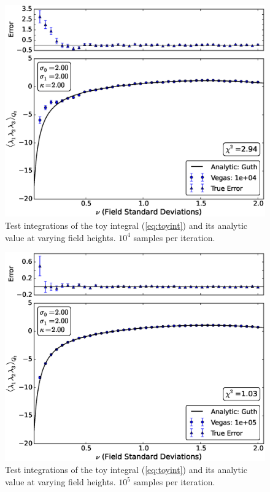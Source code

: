 \documentclass[10pt,letterpaper]{article}
\begin{document}
\FloatBarrier

\begin{figure}[t] %
\centering %
\includegraphics[scale=0.45]{images/toy_int_e4_wide.eps} 
\caption{Test integrations of the toy integral (\ref{eq:toyint}) and its analytic value at varying field heights. $10^4$ samples per iteration.}
\label{fig:toy_e4_wide}
\end{figure}

\begin{figure}[t] %
\centering %
\includegraphics[scale=0.45]{images/toy_int_e5_wide.eps} 
\caption{Test integrations of the toy integral (\ref{eq:toyint}) and its analytic value at varying field heights. $10^5$ samples per iteration.}
\label{fig:toy_e5_wide}
\end{figure}
\end{document}
